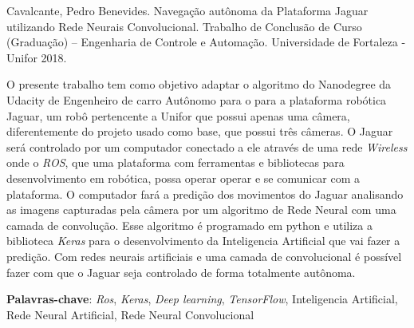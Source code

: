 
Cavalcante, Pedro Benevides. Navegação autônoma da Plataforma Jaguar utilizando Rede Neurais Convolucional. Trabalho de Conclusão de Curso (Graduação) – Engenharia de Controle e Automação. Universidade de Fortaleza - Unifor 2018.   

O presente trabalho tem como objetivo adaptar o algoritmo do Nanodegree da Udacity de Engenheiro de carro Autônomo para o para a plataforma robótica Jaguar, um robô pertencente a Unifor que possui apenas uma câmera, diferentemente do projeto usado como base, que possui três câmeras. 
O Jaguar será controlado por um computador conectado a ele através de uma rede \textit{Wireless} onde o \textit{ROS}, que uma plataforma com ferramentas e bibliotecas para desenvolvimento em robótica, possa operar operar e se comunicar com a plataforma. O computador fará a predição dos movimentos do Jaguar analisando as imagens capturadas pela câmera por um algoritmo de Rede Neural com uma camada de convolução. Esse algoritmo é programado em python e utiliza a biblioteca \textit{Keras} para o desenvolvimento da Inteligencia Artificial que vai fazer a predição. Com redes neurais artificiais e uma camada de convolucional é possível fazer  com que o Jaguar seja controlado de forma totalmente autônoma.

\textbf{Palavras-chave}: \textit{Ros}, \textit{Keras}, \textit{Deep learning}, \textit{TensorFlow}, Inteligencia Artificial, Rede Neural Artificial, Rede Neural Convolucional

